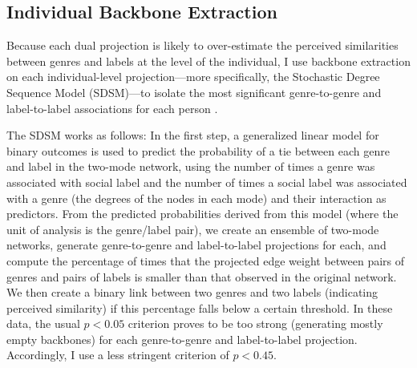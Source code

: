 \documentclass[12pt]{article}
\begin{document}
\subsection*{Individual Backbone Extraction}
Because each dual projection is likely to over-estimate the perceived similarities between genres and labels at the level of the individual, I use backbone extraction on each individual-level projection---more specifically, the Stochastic Degree Sequence Model (SDSM)---to isolate the most significant genre-to-genre and label-to-label associations for each person \citep{neal2014backbone-b29}. 

The SDSM works as follows: In the first step, a generalized linear model for binary outcomes is used to predict the probability of a tie between each genre and label in the two-mode network, using the number of times a genre was associated with social label and the number of times a social label was associated with a genre (the degrees of the nodes in each mode) and their interaction as predictors. From the predicted probabilities derived from this model (where the unit of analysis is the genre/label pair), we create an ensemble of two-mode networks, generate genre-to-genre and label-to-label projections for each, and compute the percentage of times that the projected edge weight between pairs of genres and pairs of labels is smaller than that observed in the original network. We then create a binary link between two genres and two labels (indicating perceived similarity) if this percentage falls below a certain threshold. In these data, the usual $p < 0.05$ criterion proves to be too strong (generating mostly empty backbones) for each genre-to-genre and label-to-label projection. Accordingly, I use a less stringent criterion of $p < 0.45$.  
\end{document}
